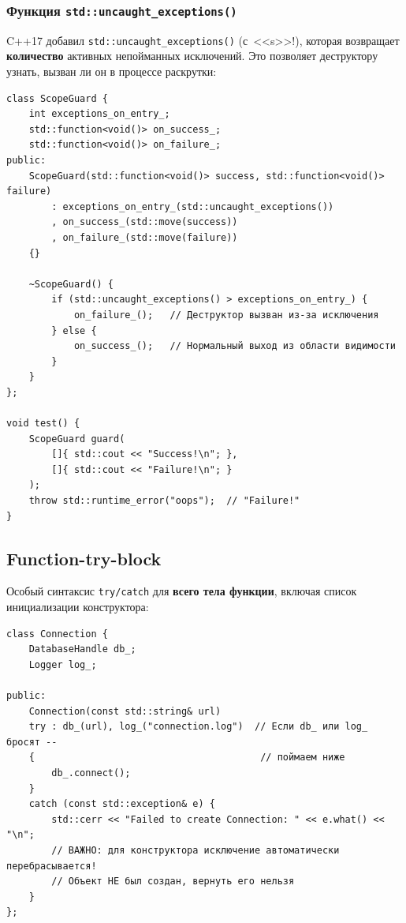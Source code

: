 \documentclass[a4paper,12pt]{article}
\begin{document}
\subsubsection{Функция \texttt{std::uncaught\_exceptions()}}

C++17 добавил \texttt{std::uncaught\_exceptions()} (с~<<s>>!), которая
возвращает \textbf{количество} активных непойманных исключений. Это позволяет
деструктору узнать, вызван ли он в процессе раскрутки:

\begin{lstlisting}
class ScopeGuard {
    int exceptions_on_entry_;
    std::function<void()> on_success_;
    std::function<void()> on_failure_;
public:
    ScopeGuard(std::function<void()> success, std::function<void()> failure)
        : exceptions_on_entry_(std::uncaught_exceptions())
        , on_success_(std::move(success))
        , on_failure_(std::move(failure))
    {}

    ~ScopeGuard() {
        if (std::uncaught_exceptions() > exceptions_on_entry_) {
            on_failure_();   // Деструктор вызван из-за исключения
        } else {
            on_success_();   // Нормальный выход из области видимости
        }
    }
};

void test() {
    ScopeGuard guard(
        []{ std::cout << "Success!\n"; },
        []{ std::cout << "Failure!\n"; }
    );
    throw std::runtime_error("oops");  // "Failure!"
}
\end{lstlisting}

\subsection{Function-try-block}

Особый синтаксис \texttt{try/catch} для \textbf{всего тела функции},
включая список инициализации конструктора:

\begin{lstlisting}
class Connection {
    DatabaseHandle db_;
    Logger log_;

public:
    Connection(const std::string& url)
    try : db_(url), log_("connection.log")  // Если db_ или log_ бросят --
    {                                        // поймаем ниже
        db_.connect();
    }
    catch (const std::exception& e) {
        std::cerr << "Failed to create Connection: " << e.what() << "\n";
        // ВАЖНО: для конструктора исключение автоматически перебрасывается!
        // Объект НЕ был создан, вернуть его нельзя
    }
};
\end{lstlisting}
\end{document}
